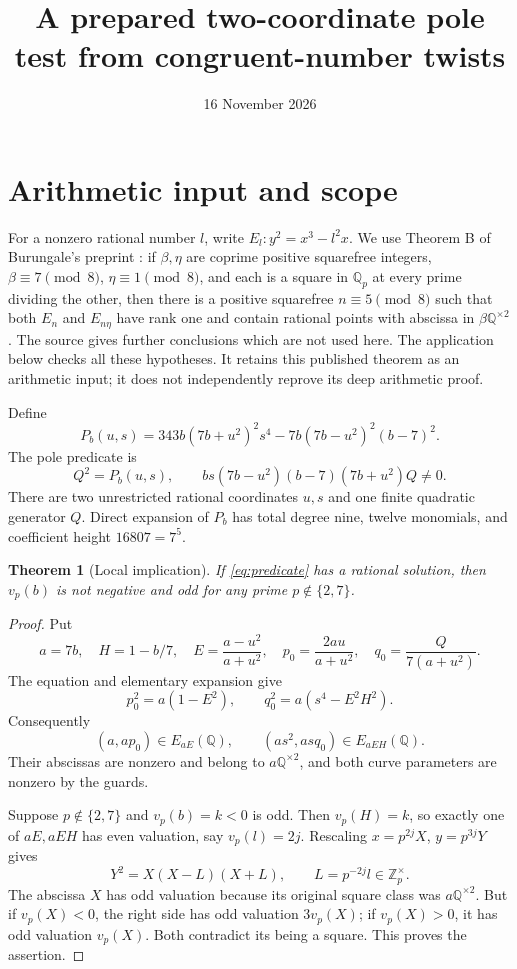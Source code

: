 \documentclass[11pt]{article}
\title{A prepared two-coordinate pole test from congruent-number twists}
\author{}\date{16 November 2026}
\newtheorem{theorem}{Theorem}
\newcommand{\Q}{\mathbb Q}
\newcommand{\Z}{\mathbb Z}
\begin{document}
\maketitle

\section{Arithmetic input and scope}

For a nonzero rational number $l$, write $E_l:y^2=x^3-l^2x$.
We use Theorem B of Burungale's preprint \cite{B}: if $\beta,\eta$ are
coprime positive squarefree integers, $\beta\equiv7\pmod8$,
$\eta\equiv1\pmod8$, and each is a square in $\Q_p$ at every prime
dividing the other, then there is a positive squarefree $n\equiv5\pmod8$
such that both $E_n$ and $E_{n\eta}$ have rank one and contain rational
points with abscissa in $\beta\Q^{\times2}$. The source gives further
conclusions which are not used here. The application below checks all
these hypotheses. It retains this published theorem as an arithmetic
input; it does not independently reprove its deep arithmetic proof.

Define
\begin{equation}\label{eq:P}
 P_b(u,s)=343b(7b+u^2)^2s^4
       -7b(7b-u^2)^2(b-7)^2.
\end{equation}
The pole predicate is
\begin{equation}\label{eq:predicate}
 Q^2=P_b(u,s),\qquad
 b s(7b-u^2)(b-7)(7b+u^2)Q\ne0.
\end{equation}
There are two unrestricted rational coordinates $u,s$ and one finite
quadratic generator $Q$. Direct expansion of $P_b$ has total degree
nine, twelve monomials, and coefficient height $16807=7^5$.

\begin{theorem}[Local implication]\label{thm:sound}
If \eqref{eq:predicate} has a rational solution, then $v_p(b)$ is not
negative and odd for any prime $p\notin\{2,7\}$.
\end{theorem}
\begin{proof}
Put
\[
 a=7b,\quad H=1-b/7,\quad
 E=\frac{a-u^2}{a+u^2},\quad
 p_0=\frac{2au}{a+u^2},\quad
 q_0=\frac{Q}{7(a+u^2)}.
\]
The equation and elementary expansion give
\[
 p_0^2=a(1-E^2),\qquad q_0^2=a(s^4-E^2H^2).
\]
Consequently
\[
 (a,ap_0)\in E_{aE}(\Q),\qquad
 (as^2,asq_0)\in E_{aEH}(\Q).
\]
Their abscissas are nonzero and belong to $a\Q^{\times2}$, and both
curve parameters are nonzero by the guards.

Suppose $p\notin\{2,7\}$ and $v_p(b)=k<0$ is odd. Then $v_p(H)=k$,
so exactly one of $aE,aEH$ has even valuation, say $v_p(l)=2j$.
Rescaling $x=p^{2j}X$, $y=p^{3j}Y$ gives
\[
 Y^2=X(X-L)(X+L),\qquad L=p^{-2j}l\in\Z_p^\times.
\]
The abscissa $X$ has odd valuation because its original square class
was $a\Q^{\times2}$. But if $v_p(X)<0$, the right side has odd
valuation $3v_p(X)$; if $v_p(X)>0$, it has odd valuation $v_p(X)$.
Both contradict its being a square. This proves the assertion.
\end{proof}
\end{document}
